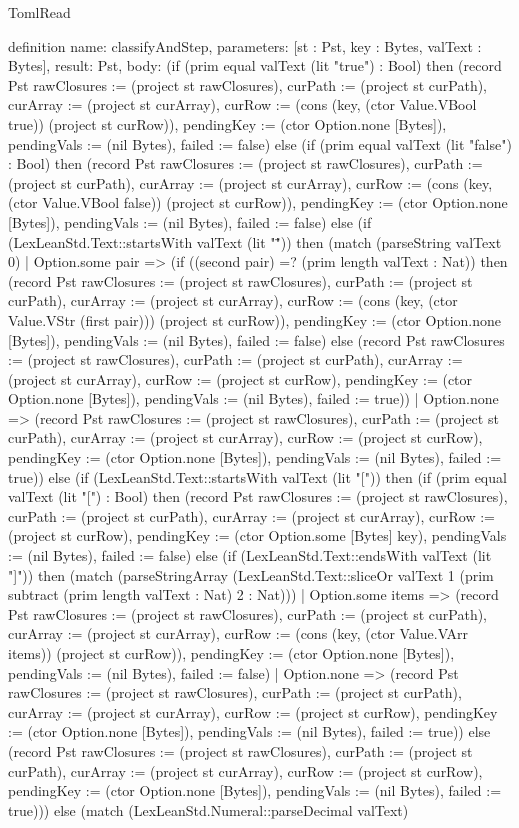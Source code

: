 \begin{lexlean}{TomlRead}
\begin{semanticmodule}
definition{
  name: classifyAndStep,
  parameters: [st : Pst, key : Bytes, valText : Bytes],
  result: Pst,
  body: (if (prim equal valText (lit "true") : Bool) then (record Pst {rawClosures := (project st rawClosures), curPath := (project st curPath), curArray := (project st curArray), curRow := (cons (key, (ctor Value.VBool true)) (project st curRow)), pendingKey := (ctor Option.none [Bytes]), pendingVals := (nil Bytes), failed := false}) else (if (prim equal valText (lit "false") : Bool) then (record Pst {rawClosures := (project st rawClosures), curPath := (project st curPath), curArray := (project st curArray), curRow := (cons (key, (ctor Value.VBool false)) (project st curRow)), pendingKey := (ctor Option.none [Bytes]), pendingVals := (nil Bytes), failed := false}) else (if (LexLeanStd.Text::startsWith valText (lit "\"")) then (match (parseString valText 0)
    | Option.some pair => (if ((second pair) =? (prim length valText : Nat)) then (record Pst {rawClosures := (project st rawClosures), curPath := (project st curPath), curArray := (project st curArray), curRow := (cons (key, (ctor Value.VStr (first pair))) (project st curRow)), pendingKey := (ctor Option.none [Bytes]), pendingVals := (nil Bytes), failed := false}) else (record Pst {rawClosures := (project st rawClosures), curPath := (project st curPath), curArray := (project st curArray), curRow := (project st curRow), pendingKey := (ctor Option.none [Bytes]), pendingVals := (nil Bytes), failed := true}))
    | Option.none => (record Pst {rawClosures := (project st rawClosures), curPath := (project st curPath), curArray := (project st curArray), curRow := (project st curRow), pendingKey := (ctor Option.none [Bytes]), pendingVals := (nil Bytes), failed := true})) else (if (LexLeanStd.Text::startsWith valText (lit "[")) then (if (prim equal valText (lit "[") : Bool) then (record Pst {rawClosures := (project st rawClosures), curPath := (project st curPath), curArray := (project st curArray), curRow := (project st curRow), pendingKey := (ctor Option.some [Bytes] key), pendingVals := (nil Bytes), failed := false}) else (if (LexLeanStd.Text::endsWith valText (lit "]")) then (match (parseStringArray (LexLeanStd.Text::sliceOr valText 1 (prim subtract (prim length valText : Nat) 2 : Nat)))
    | Option.some items => (record Pst {rawClosures := (project st rawClosures), curPath := (project st curPath), curArray := (project st curArray), curRow := (cons (key, (ctor Value.VArr items)) (project st curRow)), pendingKey := (ctor Option.none [Bytes]), pendingVals := (nil Bytes), failed := false})
    | Option.none => (record Pst {rawClosures := (project st rawClosures), curPath := (project st curPath), curArray := (project st curArray), curRow := (project st curRow), pendingKey := (ctor Option.none [Bytes]), pendingVals := (nil Bytes), failed := true})) else (record Pst {rawClosures := (project st rawClosures), curPath := (project st curPath), curArray := (project st curArray), curRow := (project st curRow), pendingKey := (ctor Option.none [Bytes]), pendingVals := (nil Bytes), failed := true}))) else (match (LexLeanStd.Numeral::parseDecimal valText)
}
\end{semanticmodule}
\end{lexlean}

